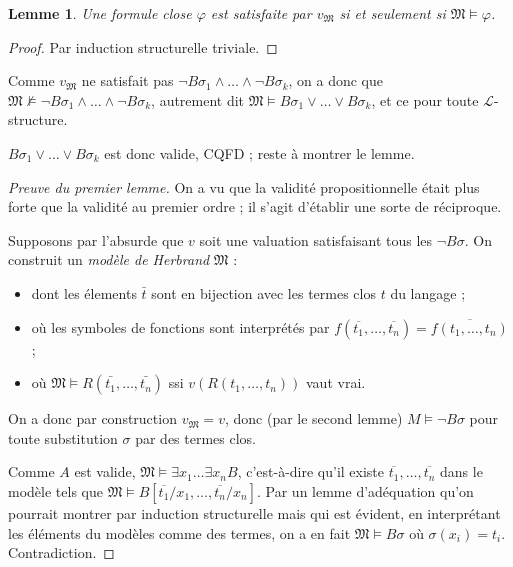 \documentclass[a4paper, 11pt]{article}
\newtheorem*{lemma}{Lemme}
\begin{document}
\begin{lemma}
  Une formule close $\varphi$ est satisfaite par $v_{\mathfrak{M}}$ si et
  seulement si $\mathfrak{M} \models \varphi$.
\end{lemma}
\begin{proof}
  Par induction structurelle triviale.
\end{proof}


Comme $v_{\mathfrak{M}}$ ne satisfait pas $\lnot B\sigma_1 \land \ldots \land
\lnot B\sigma_k$, on a donc que $\mathfrak{M} \nvDash \lnot B\sigma_1 \land
\ldots \land \lnot B\sigma_k$, autrement dit $\mathfrak{M} \models B\sigma_1
\lor \ldots \lor B\sigma_k$, et ce pour toute $\mathcal{L}$-structure.

$B\sigma_1 \lor \ldots \lor B\sigma_k$ est donc valide, CQFD ; reste à montrer
le lemme.

\begin{proof}[Preuve du premier lemme]
  On a vu que la validité propositionnelle était plus forte que la validité au
  premier ordre ; il s'agit d'établir une sorte de réciproque.

  Supposons par l'absurde que $v$ soit une valuation satisfaisant tous les
  $\lnot B\sigma$. On construit un \emph{modèle de Herbrand} $\mathfrak{M}$ :
  \begin{itemize}
  \item dont les élements $\bar{t}$ sont en bijection avec les termes clos $t$
    du langage ;
  \item où les symboles de fonctions sont interprétés par $f(\overline{t_1}, \ldots,
    \overline{t_n}) = \overline{f(t_1, \ldots, t_n)}$ ;
  \item où $\mathfrak{M} \models R(\bar{t_1}, \ldots, \bar{t_n})$ ssi $v(R(t_1,
    \ldots, t_n))$ vaut vrai.
  \end{itemize}
  On a donc par construction $v_{\mathfrak{M}} = v$, donc (par le second lemme)
  $M \models \lnot B\sigma$ pour toute substitution $\sigma$ par des termes
  clos.
  
  Comme $A$ est valide, $\mathfrak{M} \models \exists x_1 \ldots \exists x_n B$,
  c'est-à-dire qu'il existe $\overline{t_1}, \ldots, \overline{t_n}$ dans le
  modèle tels que $\mathfrak{M} \models B[\overline{t_1}/x_1, \ldots,
  \overline{t_n}/x_n]$. Par un lemme d'adéquation qu'on pourrait montrer par
  induction structurelle mais qui est évident, en interprétant les éléments du
  modèles comme des termes, on a en fait $\mathfrak{M} \models B\sigma$ où
  $\sigma(x_i) = t_i$. Contradiction.
\end{proof}
\end{document}
